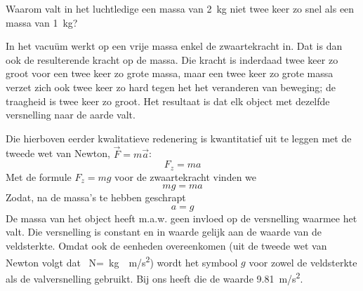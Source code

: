 
\begin{exercise}

 Waarom valt in het luchtledige een massa van \SI{2}{kg} niet twee keer zo snel als een massa van \SI{1}{kg}?

\begin{oplossing}
In het vacu\"um werkt op een vrije massa enkel de zwaartekracht in. Dat is dan ook de resulterende kracht op de massa. Die kracht is inderdaad twee keer zo groot voor een twee keer zo grote massa, maar een twee keer zo grote massa verzet zich ook twee keer zo hard tegen het het veranderen van beweging; de traagheid is twee keer zo groot. Het resultaat is dat elk object met dezelfde versnelling naar de aarde valt.

Die hierboven eerder kwalitatieve redenering is kwantitatief uit te leggen met de tweede wet van Newton, $\vec{F}=m\vec{a}$:
\begin{equation*}
F_z=ma%
\end{equation*}
Met de formule $F_z=mg$ voor de zwaartekracht vinden we
\begin{equation*}
mg=ma%
\end{equation*}
Zodat, na de massa's te hebben geschrapt
\begin{equation*}
a=g%
\end{equation*}
De massa van het object heeft m.a.w. geen invloed op de versnelling waarmee het valt. Die versnelling is constant en in waarde gelijk aan de waarde van de veldsterkte. Omdat ook de eenheden overeenkomen (uit de tweede wet van Newton volgt dat \SI{}{N}=\SI{}{kg\cdot m/s^2}) wordt het symbool $g$ voor zowel de veldsterkte als de valversnelling gebruikt. Bij ons heeft die de waarde \SI{9,81}{m/s^2}.
\end{oplossing}

\end{exercise}
